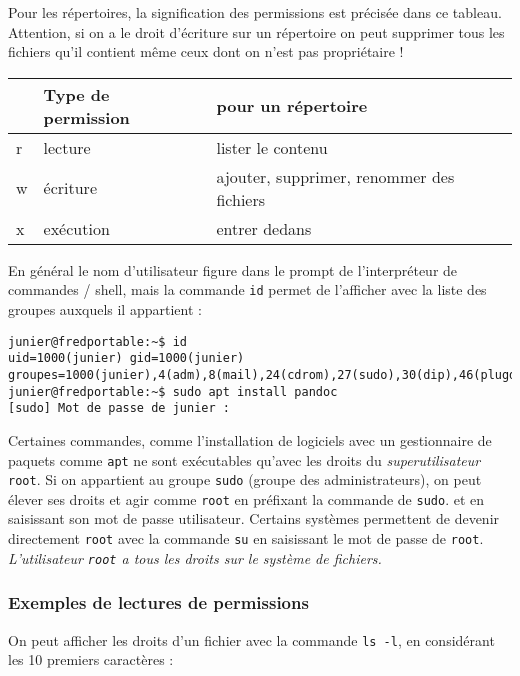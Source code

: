 \documentclass[
  11pt,
]{article}
\newcounter{prop}
\newcounter{logi}
\begin{document}
Pour les répertoires, la signification des permissions est précisée dans
ce tableau. Attention, si on a le droit d'écriture sur un répertoire on
peut supprimer tous les fichiers qu'il contient même ceux dont on n'est
pas propriétaire !

\begin{longtable}[]{@{}lll@{}}
\toprule
& Type de permission & pour un répertoire\tabularnewline
\midrule
\endhead
r & lecture & lister le contenu\tabularnewline
w & écriture & ajouter, supprimer, renommer des fichiers\tabularnewline
x & exécution & entrer dedans\tabularnewline
\bottomrule
\end{longtable}

En général le nom d'utilisateur figure dans le prompt de l'interpréteur
de commandes / shell, mais la commande \texttt{id} permet de l'afficher
avec la liste des groupes auxquels il appartient :

\begin{verbatim}
junier@fredportable:~$ id
uid=1000(junier) gid=1000(junier) groupes=1000(junier),4(adm),8(mail),24(cdrom),27(sudo),30(dip),46(plugdev),120(lpadmin),131(lxd),132(sambashare)
junier@fredportable:~$ sudo apt install pandoc
[sudo] Mot de passe de junier :
\end{verbatim}

Certaines commandes, comme l'installation de logiciels avec un
gestionnaire de paquets comme \texttt{apt} ne sont exécutables qu'avec
les droits du \emph{superutilisateur} \texttt{root}. Si on appartient au
groupe \texttt{sudo} (groupe des administrateurs), on peut élever ses
droits et agir comme \texttt{root} en préfixant la commande de
\texttt{sudo}. et en saisissant son mot de passe utilisateur. Certains
systèmes permettent de devenir directement \texttt{root} avec la
commande \texttt{su} en saisissant le mot de passe de \texttt{root}.
\emph{L'utilisateur \texttt{root} a tous les droits sur le système de
fichiers.}

\hypertarget{exemples-de-lectures-de-permissions}{%
\subsubsection{Exemples de lectures de
permissions}\label{exemples-de-lectures-de-permissions}}

On peut afficher les droits d'un fichier avec la commande
\texttt{ls\ -l}, en considérant les 10 premiers caractères :
\end{document}
